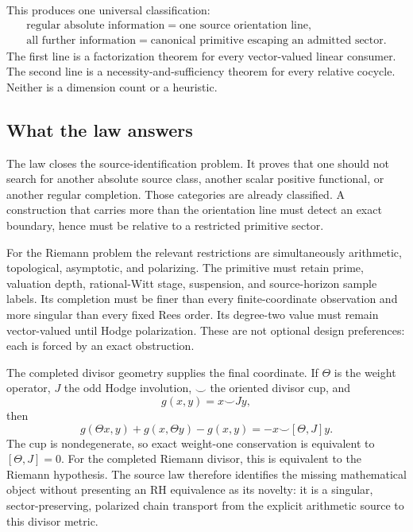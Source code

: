 \documentclass[11pt]{article}
\theoremstyle{definition}
\theoremstyle{remark}
\begin{document}
This produces one universal classification:
\[
\boxed{
\begin{gathered}
\text{regular absolute information}
   =\text{one source orientation line},\\[2mm]
\text{all further information}
   =\text{canonical primitive escaping an admitted sector}.
\end{gathered}}
\tag{1.3}\label{eq:master-law-intro}
\]
The first line is a factorization theorem for every vector-valued linear
consumer.  The second line is a necessity-and-sufficiency theorem for every
relative cocycle.  Neither is a dimension count or a heuristic.

\subsection*{What the law answers}

The law closes the source-identification problem.  It proves that one
should not search for another absolute source class, another scalar
positive functional, or another regular completion.  Those categories are
already classified.  A construction that carries more than the orientation
line must detect an exact boundary, hence must be relative to a restricted
primitive sector.

For the Riemann problem the relevant restrictions are simultaneously
arithmetic, topological, asymptotic, and polarizing.  The primitive must
retain prime, valuation depth, rational-Witt stage, suspension, and
source-horizon sample labels.  Its completion must be finer than every
finite-coordinate observation and more singular than every fixed Rees
order.  Its degree-two value must remain vector-valued until Hodge
polarization.  These are not optional design preferences: each is forced
by an exact obstruction.

The completed divisor geometry supplies the final coordinate.  If
\(\Theta\) is the weight operator, \(J\) the odd Hodge involution,
\(\smile\) the oriented divisor cup, and
\[
                       g(x,y)=x\smile Jy,
\tag{1.4}\label{eq:hodge-metric-intro}
\]
then
\[
 g(\Theta x,y)+g(x,\Theta y)-g(x,y)
   =-x\smile[\Theta,J]y.
\tag{1.5}\label{eq:purity-defect-intro}
\]
The cup is nondegenerate, so exact weight-one conservation is equivalent
to \([\Theta,J]=0\).  For the completed Riemann divisor, this is equivalent
to the Riemann hypothesis.  The source law therefore identifies the
missing mathematical object without presenting an RH equivalence as its
novelty: it is a singular, sector-preserving, polarized chain transport
from the explicit arithmetic source to this divisor metric.
\end{document}
